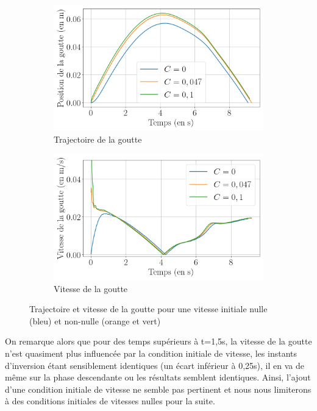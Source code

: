 \begin{figure}[H] \label{fig:resultat_vitesse}
	\centering
	\begin{subfigure}[H]{0.47\textwidth}
		\centering
		\includegraphics[width=\textwidth]{figure/influence_uinit_position.png}
		\caption{Trajectoire de la goutte}
		
	\end{subfigure} 
	\begin{subfigure}[H]{0.47\textwidth}
		\centering
		\includegraphics[width=\textwidth]{figure/influence_uinit_vitesse.png}
		\caption{Vitesse de la goutte}
	\end{subfigure}
	\caption{Trajectoire et vitesse de la goutte pour une vitesse initiale nulle (bleu) et non-nulle (orange et vert)}
\end{figure}
On remarque alors que pour des temps supérieurs à t=1,5s, la vitesse de la goutte n'est quasiment plus influencée par la condition initiale de vitesse, les instants d'inversion étant sensiblement identiques (un écart inférieur à 0,25s), il en va de même sur la phase descendante ou les résultats semblent identiques. Ainsi, l'ajout d'une condition initiale de vitesse ne semble pas pertinent et nous nous limiterons à des conditions initiales de vitesses nulles pour la suite.


